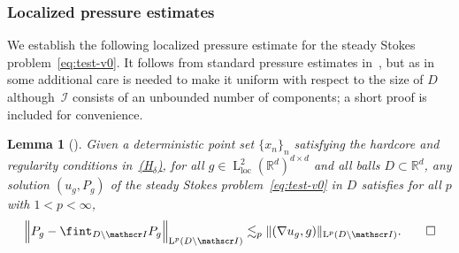 \documentclass[JEP,XML,SOM,Unicode,published]{cedram}
\let\mathcal\mathscr
\newcommand{\Hd}{\hyperref[Hd]{\textup{(H$_\delta$)}}\xspace}
\theoremstyle{plain}
\newtheorem{lem}[theor]{Lemma}
\theoremstyle{definition}
\newcommand{\R}{\mathbb R}
\newcommand{\Ic}{\mathcal I}
\newcommand{\loc}{{\operatorname{loc}}}
\newcommand{\Ld}{\operatorname{L}}
\begin{document}
\subsubsection{Localized pressure estimates}
We establish the following localized pressure estimate for the steady Stokes problem~\eqref{eq:test-v0}.
It follows from standard pressure esti\-mates in~\cite{Galdi}, but as in~\cite[Proof of Prop.\,2.1]{DG-19} some additional care is needed to make it uniform with respect to the size of $D$ although~$\Ic$ consists of an unbounded number of components; a short proof is included for convenience.

\begin{lem}[\cite{Galdi,DG-19}]\label{lem:pres}
Given a deterministic point set $\{x_{n}\}_n$ satisfying the hardcore and regularity conditions in~\Hd, for all $g\in \Ld^2_\loc(\R^d)^{d\times d}$ and all balls $D\subset\R^d$, any solution $(u_g,P_g)$ of the steady Stokes problem~\eqref{eq:test-v0} in $D$ satisfies for all $p$ with $1<p<\infty$,
\begin{equation*}
\Big\|P_g-\fint_{D\setminus\Ic}P_g\Big\|_{\Ld^p(D\setminus\Ic)}\lesssim_p \|(\nabla u_g,g)\|_{\Ld^p(D\setminus\Ic)}.\qedhere
\end{equation*}
\end{lem}
\end{document}
